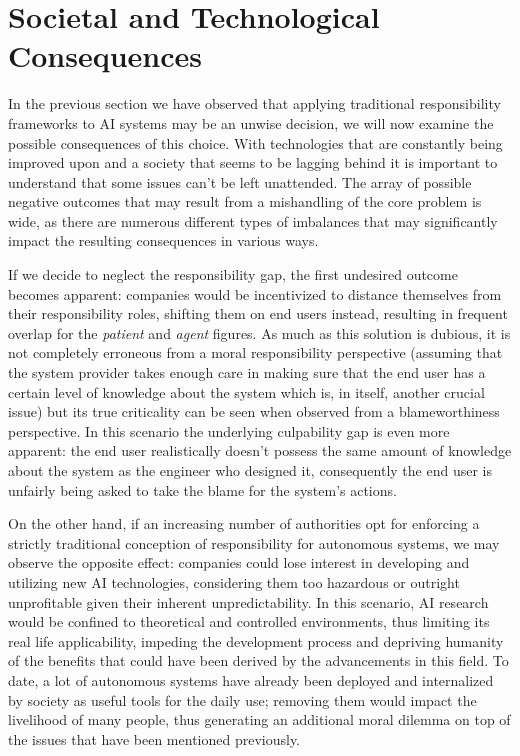 \section{Societal and Technological Consequences}\label{sec:consequences}

In the previous section we have observed that applying traditional responsibility frameworks to AI systems may be an unwise decision, we will now examine the possible consequences of this choice.
With technologies that are constantly being improved upon and a society that seems to be lagging behind it is important to understand that some issues can't be left unattended.
The array of possible negative outcomes that may result from a mishandling of the core problem is wide, as there are numerous different types of imbalances that may significantly impact the resulting consequences in various ways.

If we decide to neglect the responsibility gap, the first undesired outcome becomes apparent: companies would be incentivized to distance themselves from their responsibility roles, shifting them on end users instead, resulting in frequent overlap for the \textit{patient} and \textit{agent} figures.
As much as this solution is dubious, it is not completely erroneous from a moral responsibility perspective (assuming that the system provider takes enough care in making sure that the end user has a certain level of knowledge about the system which is, in itself, another crucial issue) but its true criticality can be seen when observed from a blameworthiness perspective.
In this scenario the underlying culpability gap \parencite{SANFRG} is even more apparent: the end user realistically doesn't possess the same amount of knowledge about the system as the engineer who designed it, consequently the end user is unfairly being asked to take the blame for the system's actions.

On the other hand, if an increasing number of authorities opt for enforcing a strictly traditional conception of responsibility for autonomous systems, we may observe the opposite effect: companies could lose interest in developing and utilizing new AI technologies, considering them too hazardous or outright unprofitable given their inherent unpredictability.
In this scenario, AI research would be confined to theoretical and controlled environments, thus limiting its real life applicability, impeding the development process and depriving humanity of the benefits that could have been derived by the advancements in this field.
To date, a lot of autonomous systems have already been deployed and internalized by society as useful tools for the daily use; removing them would impact the livelihood of many people, thus generating an additional moral dilemma on top of the issues that have been mentioned previously.

